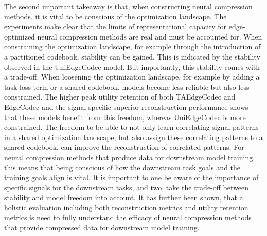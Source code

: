 The second important takeaway is that, when constructing neural compression methods, it is vital to be conscious of the optimization landscape. The experiments make clear that the limits of representational capacity for edge-optimized neural compression methods are real and must be accounted for. When constraining the optimization landscape, for example through the introduction of a partitioned codebook, stability can be gained. This is indicated by the stability observed in the UniEdgeCodec model. But importantly, this stability comes with a trade-off. When loosening the optimization landscape, for example by adding a task loss term or a shared codebook, models become less reliable but also less constrained. The higher peak utility retention of both TAEdgeCodec and EdgeCodec and the signal specific superior reconstruction performance shows that these models benefit from this freedom, whereas UniEdgeCodec is more constrained. The freedom to be able to not only learn correlating signal patterns in a shared optimization landscape, but also assign these correlating patterns to a shared codebook, can improve the reconstruction of correlated patterns. For neural compression methods that produce data for downstream model training, this means that being conscious of how the downstream task goals and the training goals align is vital. It is important to one be aware of the importance of specific signals for the downstream tasks, and two, take the trade-off between stability and model freedom into account. It has further been shown, that a holistic evaluation including both reconstruction metrics and utility retention metrics is need to fully understand the efficacy of neural compression methods that provide compressed data for downstream model training.